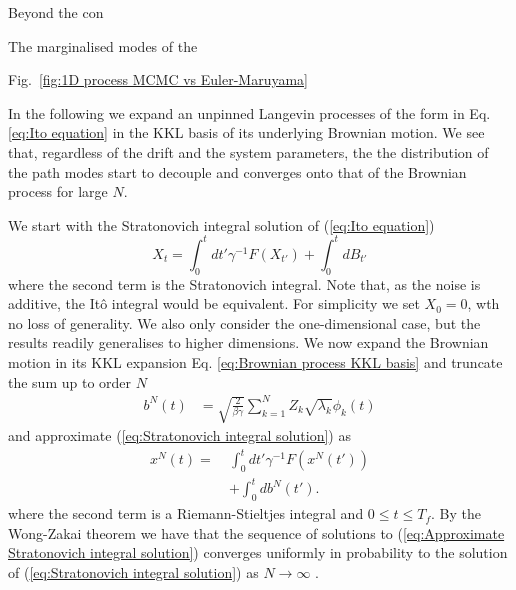 Beyond the con

The marginalised modes of the 

Fig.~\ref{fig:1D process MCMC vs Euler-Maruyama}

In the following we expand an unpinned Langevin processes of the form in Eq. \ref{eq:Ito equation} in the KKL basis of its underlying Brownian motion. We see that, regardless of the drift and the system parameters, the the distribution of the path modes start to decouple and converges onto that of the Brownian process for large $N$.

We start with the Stratonovich integral solution of (\ref{eq:Ito equation})
\begin{equation} \label{eq:Stratonovich integral solution}
X_t = \int_0^t dt' \gamma^{-1} F(X_{t'}) + \int_0^t dB_{t'}
\end{equation}
where the second term is the Stratonovich integral. Note that, as the noise is additive, the It\^{o} integral would be equivalent. For simplicity we set $X_0 = 0$, wth no loss of generality. We also only consider the one-dimensional case, but the results readily generalises to higher dimensions. We now expand the Brownian motion in its KKL expansion Eq. \ref{eq:Brownian process KKL basis} and truncate the sum up to order $N$
\begin{subequations}
\begin{align}
b^N(t) & = \sqrt{\frac{2}{\beta \gamma}} \sum_{k=1}^N Z_k \sqrt{\lambda_k} \phi_k(t)
\end{align}
\end{subequations}
and approximate (\ref{eq:Stratonovich integral solution}) as
\begin{equation} \label{eq:Approximate Stratonovich integral solution}
\begin{aligned} 
x^N(t) =\ & \int_0^t dt' \gamma^{-1} F(x^N(t'))  \\
& + \int_0^t db^N(t').
\end{aligned} 
\end{equation}
where the second term is a Riemann-Stieltjes integral and $0 \leq t \leq T_f$. By the Wong-Zakai theorem we have that the sequence of solutions to (\ref{eq:Approximate Stratonovich integral solution}) converges uniformly in probability to the solution of (\ref{eq:Stratonovich integral solution}) as $N\to\infty$ \citep{wongConvergenceOrdinaryIntegrals1965, twardowskaWongZakaiApproximationsStochastic1996, frizMultidimensionalStochasticProcesses2010}.

